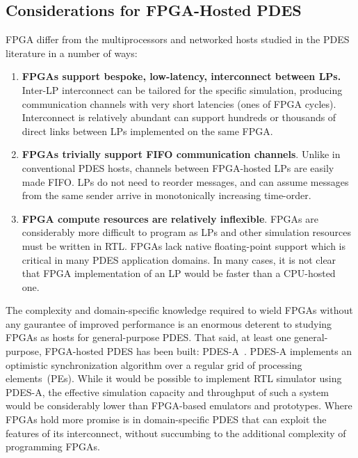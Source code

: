 

\subsection{Considerations for FPGA-Hosted PDES}

FPGA differ from the multiprocessors and networked hosts studied in the PDES literature in a number of ways:

\begin{enumerate}
\item \textbf{FPGAs support bespoke, low-latency, interconnect between LPs.} Inter-LP
interconnect can be tailored for the specific simulation, producing
communication channels with very short latencies (ones of FPGA cycles).
Interconnect is relatively abundant can support hundreds or thousands
of direct links between LPs implemented on the same FPGA.

\item \textbf{FPGAs trivially support FIFO communication channels}. Unlike in
conventional PDES hosts, channels between FPGA-hosted LPs are easily made FIFO.
LPs do not need to reorder messages, and
can assume messages from the same sender arrive in monotonically increasing
time-order.


\item \textbf{FPGA compute resources are relatively inflexible}. FPGAs are considerably more difficult to
program as LPs and other simulation resources must be written in RTL. FPGAs lack native floating-point support which is
critical in many PDES application domains. In many cases, it is not clear that
FPGA implementation of an LP would be faster than a CPU-hosted one.
\end{enumerate}

The complexity and domain-specific knowledge required to wield FPGAs without
any gaurantee of improved performance is an enormous deterent to studying FPGAs
as hosts for general-purpose PDES. That said, at least one general-purpose, FPGA-hosted
PDES has been built: PDES-A~\cite{PDESA}. PDES-A implements an optimistic
synchronization algorithm over a regular grid of processing elements~(PEs).  While it would be
possible to implement RTL simulator using PDES-A, the effective simulation
capacity and throughput of such a system would be considerably lower than
FPGA-based emulators and prototypes. Where FPGAs hold more promise is in domain-specific PDES that
can exploit the features of its interconnect, without succumbing to the additional complexity of programming FPGAs.

